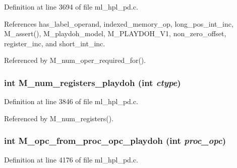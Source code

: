 Definition at line 3694 of file ml\_\-hpl\_\-pd.c.

References has\_\-label\_\-operand, indexed\_\-memory\_\-op, long\_\-pos\_\-int\_\-inc, M\_\-assert(), M\_\-playdoh\_\-model, M\_\-PLAYDOH\_\-V1, non\_\-zero\_\-offset, register\_\-inc, and short\_\-int\_\-inc.

Referenced by M\_\-num\_\-oper\_\-required\_\-for().
\subsubsection{\setlength{\rightskip}{0pt plus 5cm}int M\_\-num\_\-registers\_\-playdoh (int {\em ctype})}\label{ml__hpl__pd_8c_9e8bd35b8e3fe0de9005905a02549004}




Definition at line 3846 of file ml\_\-hpl\_\-pd.c.

Referenced by M\_\-num\_\-registers().
\subsubsection{\setlength{\rightskip}{0pt plus 5cm}int M\_\-opc\_\-from\_\-proc\_\-opc\_\-playdoh (int {\em proc\_\-opc})}\label{ml__hpl__pd_8c_b0c0c181883da4c1ce076a7f997e9eb9}




Definition at line 4176 of file ml\_\-hpl\_\-pd.c.

